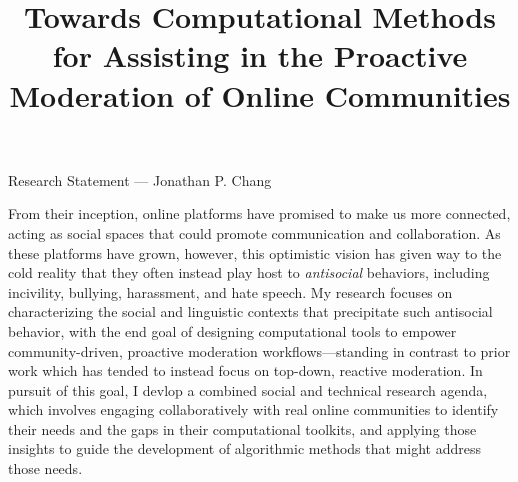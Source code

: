 \documentclass[11pt,letterpaper]{article}
\title{Towards Computational Methods for Assisting in the Proactive Moderation of Online Communities}
\begin{document}
\maketitle

\begin{center}
Research Statement --- Jonathan P. Chang
\end{center}

From their inception, online platforms have promised to make us more connected, acting as social spaces that could promote communication and collaboration. 
As these platforms have grown, however, this optimistic vision has given way to the cold reality that they often instead play host to \emph{antisocial} behaviors, including incivility, bullying, harassment, and hate speech. 
%
My research focuses on characterizing the social and linguistic contexts that precipitate such antisocial behavior, with the end goal of designing computational tools to empower community-driven, proactive moderation workflows---standing in contrast to prior work which has tended to instead focus on top-down, reactive moderation.
In pursuit of this goal, I devlop a combined social and technical research agenda, which involves engaging collaboratively with real online communities to identify their needs and the gaps in their computational toolkits, and applying those insights to guide the development of algorithmic methods that might address those needs.
\end{document}
